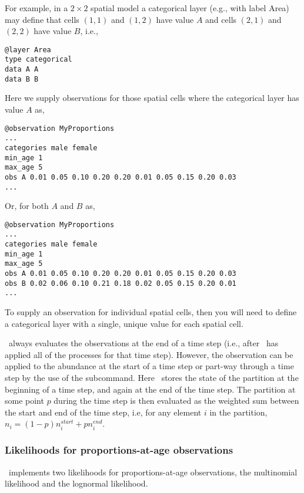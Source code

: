 For example, in a $2 \times 2$ spatial model a categorical layer (e.g., with label Area) may define that cells $(1,1)$ and $(1,2)$ have value $A$ and cells $(2,1)$ and $(2,2)$ have value $B$, i.e.,

\begin{verbatim}
@layer Area
type categorical
data A A 
data B B
\end{verbatim}

Here we supply observations for those spatial cells where the categorical layer has value $A$ as, 

\begin{verbatim}
@observation MyProportions
...
categories male female
min_age 1
max_age 5
obs A 0.01 0.05 0.10 0.20 0.20 0.01 0.05 0.15 0.20 0.03
...
\end{verbatim}

Or, for both $A$ and $B$ as,

\begin{verbatim}
@observation MyProportions
...
categories male female
min_age 1
max_age 5
obs A 0.01 0.05 0.10 0.20 0.20 0.01 0.05 0.15 0.20 0.03
obs B 0.02 0.06 0.10 0.21 0.18 0.02 0.05 0.15 0.20 0.01
...
\end{verbatim}

To supply an observation for individual spatial cells, then you will need to define a categorical layer with a single, unique value for each spatial cell. 

\SPM\ always evaluates the observations at the end of a time step (i.e., after \SPM\ has applied all of the processes for that time step). However, the observation can be applied to the abundance at the start of a time step or part-way through a time step by the use of the  subcommand. Here \SPM\ stores the state of the partition at the beginning of a time step, and again at the end of the time step. The partition at some point $p$ during the time step is then evaluated as the weighted sum between the start and end of the time step, i.e, for any element $i$ in the partition, $n_i=(1-p) n_i^{start} + p n_i^{end}$.

\subsubsection{Likelihoods for proportions-at-age observations}

\SPM\ implements two likelihoods for proportions-at-age observations, the multinomial likelihood and the lognormal likelihood. 

